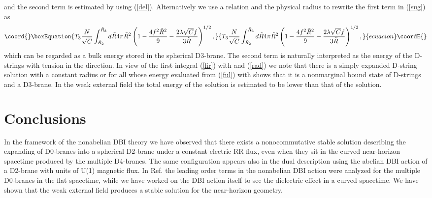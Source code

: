 \documentclass[12pt,a4paper]{article}
\providecommand{\la}{\lambda}
\begin{document}
and the second term is estimated by using (\ref{del}). Alternatively
we use a relation \myHighlight{$T_1 = 2\pi\la T_3$}\coordHE{} and the physical radius to
rewrite the first term in (\ref{sug}) as
\begin{equation}\coord{}\boxEquation{
T_3 \frac{N}{\sqrt{C}}\int_{\tilde{R}_2}^{\tilde{R}_3} d\tilde{R}
4\pi \tilde{R}^2\left( 1 - \frac{4f^2\tilde{R}^2}{9}
-\frac{2\la\sqrt{C}f}{3\tilde{R}}\right)^{1/2},
}{
T_3 \frac{N}{\sqrt{C}}\int_{\tilde{R}_2}^{\tilde{R}_3} d\tilde{R}
4\pi \tilde{R}^2\left( 1 - \frac{4f^2\tilde{R}^2}{9}
-\frac{2\la\sqrt{C}f}{3\tilde{R}}\right)^{1/2},
}{ecuacion}\coordE{}\end{equation}
which can be regarded as a bulk energy stored in the spherical 
D3-brane. The second term is naturally interpreted as the energy
of the \coordHE{} D-strings with tension \coordHE{} in the \coordHE{} direction.
In view of the first integral (\ref{fir}) with \coordHE{} and (\ref{rad})
we note that there is a simply expanded D-string solution with a
constant radius \coordHE{} or \coordHE{} for all \myHighlight{$\sigma$}\coordHE{} whose energy 
evaluated from (\ref{ful}) with \coordHE{} shows that it is a
nonmarginal bound state of \coordHE{} D-strings and a D3-brane.
In the weak external field the total energy of the \coordHE{} solution is
estimated to be lower than that of the \coordHE{} solution.

\section{Conclusions}

In the framework of the nonabelian DBI theory we have observed that
there exists a nonocommutative stable solution describing 
the expanding of \coordHE{} D0-branes into 
a  spherical D2-brane under a constant electric RR flux, even when
they sit in the curved near-horizon spacetime produced by the multiple
D4-branes. The same configuration appears also in the dual description 
using the abelian DBI action of a D2-brane with \coordHE{} units of U(1) magnetic
flux. In Ref. \cite{RCM} the leading order terms in the nonabelian DBI 
action were analyzed for the multiple D0-branes in the flat spacetime,
while we have worked on the DBI action itself to see the dielectric 
effect in a curved spacetime. We have shown that the weak external 
field produces a stable solution for the near-horizon geometry.
\end{document}

